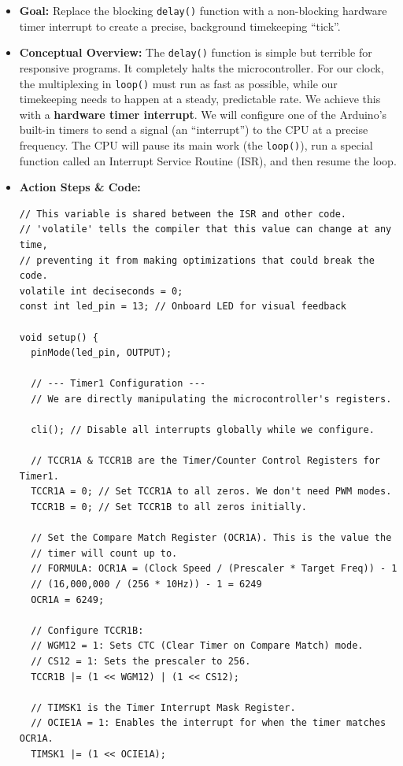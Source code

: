 \documentclass[11pt,a4paper]{article}
\begin{document}
\begin{itemize}
    \item \textbf{Goal:} Replace the blocking \verb|delay()| function with a non-blocking hardware timer interrupt to create a precise, background timekeeping ``tick''.
    \item \textbf{Conceptual Overview:} The \verb|delay()| function is simple but terrible for responsive programs. It completely halts the microcontroller. For our clock, the multiplexing in \verb|loop()| must run as fast as possible, while our timekeeping needs to happen at a steady, predictable rate. We achieve this with a \textbf{hardware timer interrupt}. We will configure one of the Arduino's built-in timers to send a signal (an ``interrupt'') to the CPU at a precise frequency. The CPU will pause its main work (the \verb|loop()|), run a special function called an Interrupt Service Routine (ISR), and then resume the loop.
    \item \textbf{Action Steps \& Code:}
\begin{lstlisting}[caption={Code for Module 3.3: 10Hz Hardware Interrupt}]
// This variable is shared between the ISR and other code.
// 'volatile' tells the compiler that this value can change at any time,
// preventing it from making optimizations that could break the code.
volatile int deciseconds = 0;
const int led_pin = 13; // Onboard LED for visual feedback

void setup() {
  pinMode(led_pin, OUTPUT);

  // --- Timer1 Configuration ---
  // We are directly manipulating the microcontroller's registers.
  
  cli(); // Disable all interrupts globally while we configure.

  // TCCR1A & TCCR1B are the Timer/Counter Control Registers for Timer1.
  TCCR1A = 0; // Set TCCR1A to all zeros. We don't need PWM modes.
  TCCR1B = 0; // Set TCCR1B to all zeros initially.

  // Set the Compare Match Register (OCR1A). This is the value the
  // timer will count up to.
  // FORMULA: OCR1A = (Clock Speed / (Prescaler * Target Freq)) - 1
  // (16,000,000 / (256 * 10Hz)) - 1 = 6249
  OCR1A = 6249;

  // Configure TCCR1B:
  // WGM12 = 1: Sets CTC (Clear Timer on Compare Match) mode.
  // CS12 = 1: Sets the prescaler to 256.
  TCCR1B |= (1 << WGM12) | (1 << CS12);

  // TIMSK1 is the Timer Interrupt Mask Register.
  // OCIE1A = 1: Enables the interrupt for when the timer matches OCR1A.
  TIMSK1 |= (1 << OCIE1A);


\end{lstlisting}
\end{itemize}
\end{document}
